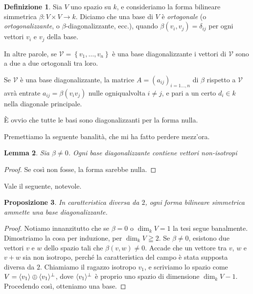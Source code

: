 \documentclass[a4paper]{amsproc}
\theoremstyle{plain}
\newtheorem{prp}{Proposizione}[section]
\newtheorem{lemma}[prp]{Lemma}
\theoremstyle{definition}
\newtheorem{dfn}[prp]{Definizione}
\theoremstyle{remark}
\DeclarePairedDelimiter{\cl}{\langle}{\rangle}
\begin{document}
\begin{dfn}
  Sia $ V $ uno spazio su $ k $, e consideriamo la forma bilineare simmetrica $ \beta\colon V\times V\to k $. Diciamo che una base di $ V $ è \emph{ortogonale} (o \emph{ortogonalizzante}, o \emph{$ \beta $}-diagonalizzante, ecc.), quando $ \beta(v_i,v_j) = \delta_{ij} $ per ogni vettori $ v_i $ e $ v_j $ della base.
\end{dfn}

In altre parole, se $ \mathcal V = \left\{v_1,\dots,v_n\right\} $ è una base diagonalizzante i vettori di $ \mathcal V $ sono a due a due ortogonali tra loro.

Se $ \mathcal V $ è una base diagonalizzante, la matrice $ A = \left(a_{ij}\right)_{i = 1\dots,n} $ di $ \beta $ rispetto a $ \mathcal V $ avrà entrate $ a_{ij} = \beta(v_iv_j) $ nulle ogniqualvolta $ i\neq j $, e pari a un certo $ d_i\in k $ nella diagonale principale.

È ovvio che tutte le basi sono diagonalizzanti per la forma nulla.

Premettiamo la seguente banalità, che mi ha fatto perdere mezz'ora.

\begin{lemma}
  Sia $ \beta\neq 0 $. Ogni base diagonalizzante contiene vettori non-isotropi
\end{lemma}
\begin{proof}
  Se così non fosse, la forma sarebbe nulla.
\end{proof}

Vale il seguente, notevole.

\begin{prp}
In caratteristica diversa da $ 2 $, ogni forma bilineare simmetrica ammette una base diagonalizzante.
\end{prp}
\begin{proof}
  Notiamo innanzitutto che se $ \beta = 0 $ o $ \dim_kV = 1 $ la tesi segue banalmente. Dimostriamo la cosa per induzione, per $ \dim_kV\geqq 2 $. Se $ \beta\neq 0 $, esistono due vettori $ v $ e $ w $ dello spazio tali che $ \beta(v,w)\neq 0 $. Accade che un vettore tra $ v $, $ w $ e $ v + w $ sia non isotropo, perché la caratteristica del campo è stata supposta diversa da $ 2 $. Chiamiamo il ragazzo isotropo $ v_1 $, e scriviamo lo spazio come $ V = \cl{v_1}\oplus\cl{v_1}^\perp $, dove $ \cl{v_1}^\perp $ è proprio uno spazio di dimensione $ \dim_kV - 1 $. Procedendo così, otteniamo una base.
\end{proof}
\end{document}
